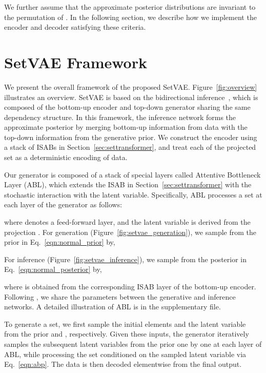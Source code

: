 \documentclass[final]{arxiv/cvpr}
\begin{document}
We further assume that the approximate posterior distributions  are invariant to the permutation of .
In the following section, we describe how we implement the encoder and decoder satisfying these criteria.

\section{SetVAE Framework}
\label{sec:architecture}
We present the overall framework of the proposed SetVAE. 
Figure~\ref{fig:overview} illustrates an overview.
SetVAE is based on the bidirectional inference~\cite{sonderby2016ladder}, which is composed of the bottom-up encoder and top-down generator sharing the same dependency structure.
In this framework, the inference network forms the approximate posterior by merging bottom-up information from data with the top-down information from the generative prior.
We construct the encoder using a stack of ISABs in Section~\ref{sec:settransformer}, and treat each of the projected set  as a deterministic encoding of data.

Our generator is composed of a stack of special layers called Attentive Bottleneck Layer (ABL), which extends the ISAB in Section~\ref{sec:settransformer} with the stochastic interaction with the latent variable.
Specifically, ABL processes a set at each layer of the generator as follows:

where  denotes a feed-forward layer, and the latent variable  is derived from the projection .
For generation (Figure~\ref{fig:setvae_generation}), we sample  from the prior in Eq.~\eqref{eqn:normal_prior} by,

For inference (Figure~\ref{fig:setvae_inference}), we sample  from the posterior in Eq.~\eqref{eqn:normal_posterior} by,

where  is obtained from the corresponding ISAB layer of the bottom-up encoder.
Following \cite{sonderby2016ladder}, we share the parameters between the generative and inference networks.
A detailed illustration of ABL is in the supplementary file.

To generate a set, we first sample the initial elements  and the latent variable  from the prior  and , respectively. 
Given these inputs, the generator iteratively samples the subsequent latent variables  from the prior  one by one at each layer of ABL, while processing the set conditioned on the sampled latent variable via Eq.~\eqref{eqn:abp}. 
The data  is then decoded elementwise from the final output.
\end{document}
